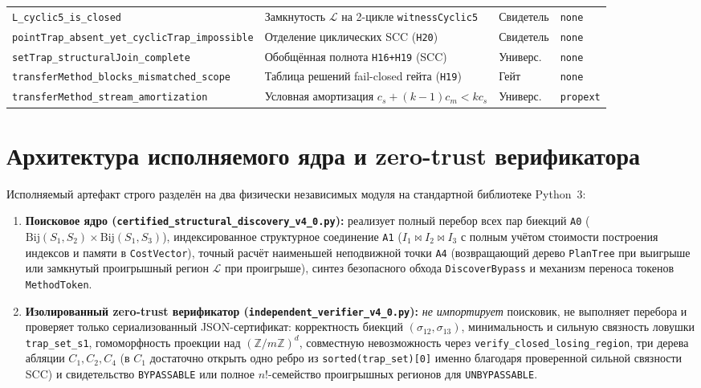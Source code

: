 \documentclass[10pt,a4paper]{article}
\newcommand{\code}[1]{\nolinkurl{#1}}
\begin{document}
\begin{table}[!htbp]
\begin{tabularx}{\linewidth}{@{}>{\raggedright\arraybackslash}p{6.5cm}>{\raggedright\arraybackslash}Xll@{}}
\code{L_cyclic5_is_closed} & Замкнутость $\mathcal{L}$ на 2-цикле \code{witnessCyclic5} & Свидетель & \code{none} \\
\code{pointTrap_absent_yet_cyclicTrap_impossible} & Отделение циклических SCC (\code{H20}) & Свидетель & \code{none} \\
\code{setTrap_structuralJoin_complete} & Обобщённая полнота \code{H16+H19} (SCC) & Универс. & \code{none} \\
\code{transferMethod_blocks_mismatched_scope} & Таблица решений fail-closed гейта (\code{H19}) & Гейт & \code{none} \\
\code{transferMethod_stream_amortization} & Условная амортизация $c_s+(k-1)c_m<kc_s$ & Универс. & \code{propext} \\
\bottomrule
\end{tabularx}
\end{table}

\section{Архитектура исполняемого ядра и zero-trust верификатора}

Исполняемый артефакт строго разделён на два физически независимых модуля на стандартной библиотеке Python~3:
\begin{enumerate}
\item \textbf{Поисковое ядро (\code{certified_structural_discovery_v4_0.py}):} реализует полный перебор всех пар биекций \code{A0} ($\mathrm{Bij}(S_1, S_2) \times \mathrm{Bij}(S_1, S_3)$), индексированное структурное соединение \code{A1} ($I_1 \bowtie I_2 \bowtie I_3$ с полным учётом стоимости построения индексов и памяти в \code{CostVector}), точный расчёт наименьшей неподвижной точки \code{A4} (возвращающий дерево \code{PlanTree} при выигрыше или замкнутый проигрышный регион $\mathcal{L}$ при проигрыше), синтез безопасного обхода \code{DiscoverBypass} и механизм переноса токенов \code{MethodToken}.
\item \textbf{Изолированный zero-trust верификатор (\code{independent_verifier_v4_0.py}):} \emph{не импортирует} поисковик, не выполняет перебора и проверяет только сериализованный JSON-сертификат: корректность биекций $(\sigma_{12}, \sigma_{13})$, минимальность и сильную связность ловушки \code{trap_set_s1}, гомоморфность проекции над $(\mathbb{Z}/m\mathbb{Z})^d$, совместную невозможность через \code{verify_closed_losing_region}, три дерева абляции $C_1, C_2, C_4$ (в $C_1$ достаточно открыть одно ребро из \code{sorted(trap_set)[0]} именно благодаря проверенной сильной связности SCC) и свидетельство \code{BYPASSABLE} или полное $n!$-семейство проигрышных регионов для \code{UNBYPASSABLE}.
\end{enumerate}
\end{document}
